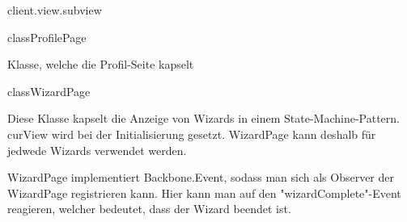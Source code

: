 \begin{texdocpackage}{client.view.subview}
\begin{texdocclass}{class}{ProfilePage}
\label{texdoclet:edu.kit.informatik.studyplan.client.view.subview.ProfilePage}
\begin{texdocclassintro}
Klasse, welche die Profil-Seite kapselt\end{texdocclassintro}
\begin{texdocclassfields}
\end{texdocclassfields}
\begin{texdocclassconstructors}
\end{texdocclassconstructors}
\begin{texdocclassmethods}
\end{texdocclassmethods}
\end{texdocclass}


\begin{texdocclass}{class}{WizardPage}
\label{texdoclet:edu.kit.informatik.studyplan.client.view.subview.WizardPage}
\begin{texdocclassintro}
Diese Klasse kapselt die Anzeige von Wizards in einem State-Machine-Pattern.
 curView wird bei der Initialisierung gesetzt. WizardPage kann deshalb für
 jedwede Wizards verwendet werden.\texdocbr{}

 WizardPage implementiert Backbone.Event, sodass man sich als Observer der
 WizardPage registrieren kann. Hier kann man auf den "wizardComplete"-Event
 reagieren, welcher bedeutet, dass der Wizard beendet ist.\end{texdocclassintro}
\begin{texdocclassfields}
\end{texdocclassfields}
\begin{texdocclassfields}
\end{texdocclassfields}
\begin{texdocclassconstructors}
\end{texdocclassconstructors}
\begin{texdocclassmethods}
\end{texdocclassmethods}
\end{texdocclass}


\end{texdocpackage}
